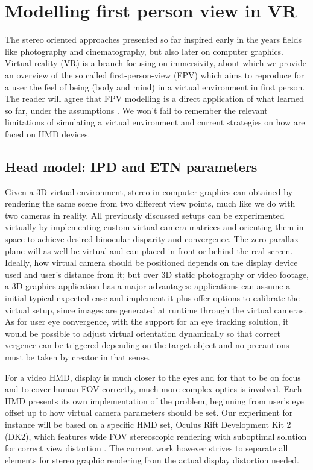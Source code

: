 \section{Modelling first person view in VR}

The stereo oriented approaches presented so far inspired early in the years fields like photography and cinematography, but also later on computer graphics. Virtual reality (VR) is a branch focusing on immersivity, about which we provide an overview of the so called first-person-view (FPV) which aims to reproduce for a user the feel of being (body and mind) in a virtual environment in first person. The reader will agree that FPV modelling is a direct application of what learned so far, under the assumptions . We won't fail to remember  the relevant limitations of simulating a virtual environment and current strategies on how are faced on HMD devices.

\subsection{Head model: IPD and ETN parameters}
Given a 3D virtual environment, stereo in computer graphics can obtained by rendering the same scene from two different view points, much like we do with two cameras in reality. All previously discussed setups can be experimented virtually by implementing custom virtual camera matrices and orienting them in space to achieve desired binocular disparity and convergence. The zero-parallax plane will as well be virtual and can placed in front or behind the real screen. Ideally, how virtual camera should be positioned depends on the display device used and user's distance from it; but over 3D static photography or video footage, a 3D graphics application has a major advantages: applications can assume a initial typical expected case and implement it plus offer options to calibrate the virtual setup, since images are generated at runtime through the virtual cameras. As for user eye convergence, with the support for an eye tracking solution, it would be possible to adjust virtual orientation dynamically so that correct vergence can be triggered depending on the target object and no precautions must be taken by creator in that sense.

For a video HMD, display is much closer to the eyes and for that to be on focus and to cover human FOV correctly, much more complex optics is involved. Each HMD presents its own implementation of the problem, beginning from user's eye offset up to how virtual camera parameters should be set. Our experiment for instance will be based on a specific HMD set, Oculus Rift Development Kit 2 (DK2), which features wide FOV stereoscopic rendering with suboptimal solution for correct view distortion \cite{link_oculus_limits}. The current work however strives to separate all elements for stereo graphic rendering from the actual display distortion needed.

